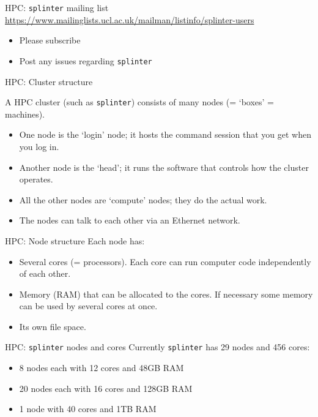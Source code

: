 \documentclass{beamer}
\begin{document}
\begin{frame}{HPC: \texttt{splinter} mailing list}
	\url{https://www.mailinglists.ucl.ac.uk/mailman/listinfo/splinter-users}
	\bigskip
	\begin{itemize}
		\item Please subscribe
		\item Post any issues regarding \texttt{splinter}
	\end{itemize}
\end{frame}

\begin{frame}{HPC: Cluster structure}

  A HPC cluster (such as \texttt{splinter}) consists of many nodes (= `boxes' = machines).
  \begin{itemize}
    \item One node is the `login' node; it hosts the command session that you get when you log in.
    \item Another node is the `head'; it runs the software that controls how the cluster operates.
    \item All the other nodes are `compute' nodes; they do the actual work.
    \item The nodes can talk to each other via an Ethernet network.
  \end{itemize}

\end{frame}

\begin{frame}{HPC: Node structure}
  Each node has:
  \begin{itemize}
    \item Several cores  (= processors). Each core can run computer code independently of each other.
    \item Memory (RAM) that can be allocated to the cores. If necessary some memory can be used by several cores at once.
    \item Its own file space.
  \end{itemize}
\end{frame}


\begin{frame}{HPC: \texttt{splinter} nodes and cores}
	Currently \texttt{splinter} has 29 nodes and 456 cores:
	\begin{itemize}
		\item 8 nodes each with 12 cores and 48GB RAM
		\item 20 nodes each with 16 cores and 128GB RAM
		\item 1 node with 40 cores and 1TB RAM
	\end{itemize}
\end{frame}
\end{document}
